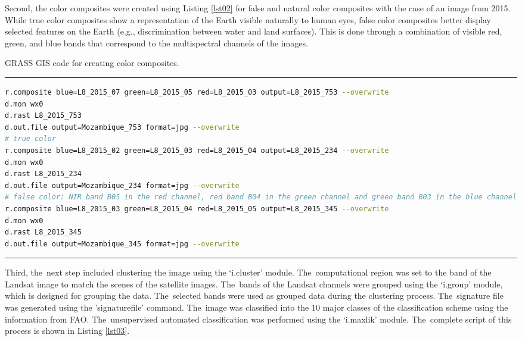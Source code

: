 \documentclass[coasts,article,accept,pdftex,oneauthor]{Definitions/mdpi}
\begin{document}
Second, {the }color composites were created using Listing \ref{lst02} for false and natural color composites with the case of an image from 2015. {While true color composites show a representation of the Earth visible naturally to human eyes, false color composites better display selected features on the Earth (e.g., discrimination between water and land surfaces). {This is done }through a combination of visible red, green, and blue bands that correspond to the multispectral channels of the images}.

\vspace{-6pt}
\begin{listing}[H]
\caption{GRASS GIS code for creating color composites.}
\rule{\columnwidth}{1pt}
\begin{lstlisting}[language=bash,caption={},style=mystyle,label={lst02}]
r.composite blue=L8_2015_07 green=L8_2015_05 red=L8_2015_03 output=L8_2015_753 --overwrite
d.mon wx0
d.rast L8_2015_753
d.out.file output=Mozambique_753 format=jpg --overwrite
# true color
r.composite blue=L8_2015_02 green=L8_2015_03 red=L8_2015_04 output=L8_2015_234 --overwrite
d.mon wx0
d.rast L8_2015_234
d.out.file output=Mozambique_234 format=jpg --overwrite
# false color: NIR band B05 in the red channel, red band B04 in the green channel and green band B03 in the blue channel
r.composite blue=L8_2015_03 green=L8_2015_04 red=L8_2015_05 output=L8_2015_345 --overwrite
d.mon wx0
d.rast L8_2015_345
d.out.file output=Mozambique_345 format=jpg --overwrite
\end{lstlisting}
\rule{\columnwidth}{1pt}
\end{listing}\vspace{-9pt}

Third, the~next step included clustering the image using the `i.cluster' module. The~computational region was set to the band of the Landsat image to match the scenes {of the satellite images}. The~bands of {the }Landsat channels were grouped using {the} `i.group' module, {which is designed }for grouping the data{. {The}~selected bands} were used as grouped data during {the }clustering {process. }The~signature file was generated using {the }'signaturefile' command. The~image was classified into {the }10 major classes of the classification scheme using {the} information from FAO. {The}~unsupervised automated classification was performed using the `i.maxlik' module. The~complete script {of this process }is shown in Listing \ref{lst03}. 
 
\end{document}

